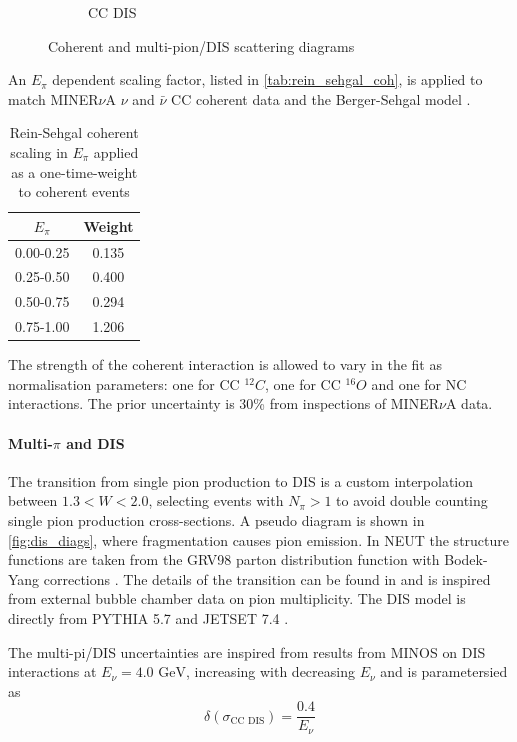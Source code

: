 \begin{figure}[h]
\begin{subfigure}[t]{0.42\textwidth}
		\caption{CC DIS}
		\label{fig:dis_diags}
	\end{subfigure}
	\caption{Coherent and multi-pion/DIS scattering diagrams}
	\label{fig:coh_dis_diags}
\end{figure}

An $E_\pi$ dependent scaling factor, listed in \autoref{tab:rein_sehgal_coh}, is applied to match MINER$\nu$A $\nu$ and $\bar{\nu}$ CC coherent data \cite{MIN_coh} and the Berger-Sehgal model \cite{Berger_Sehgal_coh}.
\begin{table}[h]
	\begin{tabular}{c | c}
		\hline
		\hline
		$E_\pi$ & Weight \\
		\hline
		0.00-0.25 & 0.135 \\
		0.25-0.50 & 0.400 \\
		0.50-0.75 & 0.294 \\
		0.75-1.00 & 1.206 \\
		\hline
		\hline
	\end{tabular}
\caption{Rein-Sehgal coherent scaling in $E_\pi$ applied as a one-time-weight to coherent events}
\label{tab:rein_sehgal_coh}
\end{table}

The strength of the coherent interaction is allowed to vary in the fit as normalisation parameters: one for CC $^{12}C$, one for CC $^{16}O$ and one for NC interactions. The prior uncertainty is 30\% from inspections of MINER$\nu$A data.

\paragraph{Multi-$\pi$ and DIS}
The transition from single pion production to DIS is a custom interpolation between $1.3 < W < 2.0$, selecting events with $N_\pi>1$ to avoid double counting single pion production cross-sections. A pseudo diagram is shown in \autoref{fig:dis_diags}, where fragmentation causes pion emission. In NEUT the structure functions are taken from the GRV98 parton distribution function \cite{grv98} with Bodek-Yang corrections \cite{bodek_yang}. The details of the transition can be found in \cite{neut} and is inspired from external bubble chamber data on pion multiplicity. The DIS model is directly from PYTHIA 5.7 and JETSET 7.4 \cite{pythia}.

The multi-pi/DIS uncertainties are inspired from results from MINOS \cite{minos_mult} on DIS interactions at $E_\nu = 4.0 \text{ GeV}$, increasing with decreasing $E_\nu$ and is parametersied as 
\begin{equation}
\delta\left(\sigma_\text{CC DIS}\right) = \frac{0.4}{E_\nu}
\end{equation}

